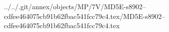 ../../.git/annex/objects/MP/7V/MD5E-s8902--cdfee464075cb91b62fbac541fcc79c4.tex/MD5E-s8902--cdfee464075cb91b62fbac541fcc79c4.tex